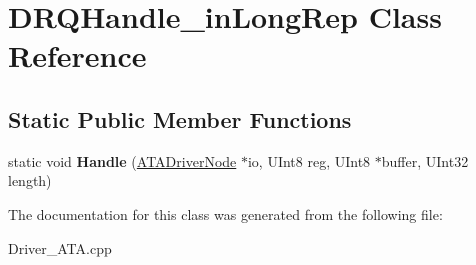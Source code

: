\hypertarget{class_d_r_q_handle__in_long_rep}{}\section{D\+R\+Q\+Handle\+\_\+in\+Long\+Rep Class Reference}
\label{class_d_r_q_handle__in_long_rep}
\subsection*{Static Public Member Functions}
\begin{DoxyCompactItemize}
\item 
\mbox{\label{class_d_r_q_handle__in_long_rep_af51dff8cad08d8a2271c4144b52f4cb5}} 
static void {\bfseries Handle} (\hyperlink{class_a_t_a_driver_node}{A\+T\+A\+Driver\+Node} $\ast$io, U\+Int8 reg, U\+Int8 $\ast$buffer, U\+Int32 length)
\end{DoxyCompactItemize}


The documentation for this class was generated from the following file\+:\begin{DoxyCompactItemize}
\item 
Driver\+\_\+\+A\+T\+A.\+cpp\end{DoxyCompactItemize}
